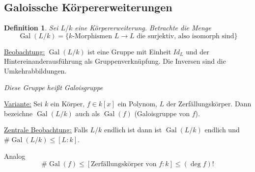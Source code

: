 \documentclass[a4paper,12pt,numbers=noenddot,parskip=full]{scrartcl}
\newcommand{\heading}{\underline}
\DeclareMathOperator{\Gal}{Gal}
\theoremstyle{dotless}
\newtheorem{definition}[theorem]{Definition}
\theoremstyle{remark}
\begin{document}
	\subsection{Galoissche Körpererweiterungen}
	
	\begin{definition}
		Sei $L/k$ eine Körpererweiterung. Betrachte die Menge
		\begin{equation*}
			\Gal(L/k) = \{ \text{$k$-Morphismen $L \to L$ die surjektiv, also isomorph sind} \}
		\end{equation*}
	\end{definition}

	\heading{Beobachtung:} $\Gal(L/k)$ ist eine Gruppe mit Einheit $Id_L$ und der Hintereinanderausführung als Gruppenverknüpfung. Die Inversen sind die Umkehrabbildungen.
	
	\textit{Diese Gruppe heißt Galoisgruppe}
	
	\heading{Variante:} Sei $k$ ein Körper, $f \in k[x]$ ein Polynom, $L$ der Zerfällungskörper. Dann bezeichne $\Gal(L/k)$ auch als $\Gal(f)$ (Galoisgruppe von $f$).
	
	\heading{Zentrale Beobachtung:} Falls $L/k$ endlich ist dann ist $\Gal(L/k)$ endlich und $\#\Gal(L/k) \leq [L: k]$.
	
	Analog
	\begin{equation*}
		\#\Gal(f) \leq [ \text{Zerfällungskörper von $f$}: k ] \leq (\deg f)!
	\end{equation*}
	
\end{document}
